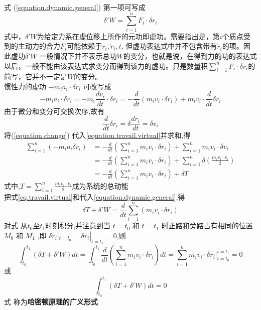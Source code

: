 \documentclass{article}
\begin{document}
式 (\ref{equation.dynamic.general})
第一项可写成
\begin{equation}
 \delta 'W=\sum_{i=1}^n F_i \cdot \delta r_i
 \label{eq.travail.virtual}
\end{equation}
式中，$\delta'W$为给定力系在虚位移上所作的元功即虚功。需要指出是，第$i$个质点受到的主动力的合力$F_i$可能依赖于$r_i,\dot{r}_i,t$,
但虚功表达式中并不包含带有$\dot{r}_i$的项。因此虚功$\delta 'W$ 一般情况下并不表示总功$W$的变分，也就是说，在得到力的功的表达式以后，一般不能由该表达式求变分而得到该力的虚功。只是数量积$\sum_{i=1}^n F_i \cdot \delta r_i$的简写，它并不一定是$W$的变分。
\\
惯性力的虚功
$
-m_ia_i\cdot \delta r_i
$
可改写成
\begin{equation}
-m_ia_i\cdot \delta r_i=-m_i \frac{dv_i}{dt} \cdot \delta r_i = - \frac{d}{dt}(m_i v_i \cdot \delta r_i) + m_i v_i \cdot \frac{d}{dt}\delta r_i
\label{equation.travail.virtual}
\end{equation}
由于微分和变分可交换次序,故有
\begin{equation}
 \frac{d}{dt}\delta r_i =\delta \frac{dr_i}{dt} =\delta v_i
 \label{equation.change}
\end{equation}
将(\ref{equation.change}) 代入\eqref{equation.travail.virtual}并求和,得
\begin{equation}
 \begin{split}
  \sum_{i=1}^n (-m_ia_i \delta r_i)& = -\frac{d}{dt}(\sum_{i=1}^n m_i v_i \cdot \delta r_i) + \sum_{i=1}^n m_i v_i\cdot \delta v_i\\
  & = -\frac{d}{dt}(\sum_{i=1}^n m_i v_i \cdot \delta r_i) + \sum_{i=1}^n \delta (\frac{m_i v_i \cdot v_i}{2}) \\
  & = -\frac{d}{dt}(\sum_{i=1}^n m_i v_i \cdot \delta r_i) + \delta T
 \end{split}
\end{equation}
式中,$T=\sum_{i=1}^n \frac{m_i v_i \cdot v_i}{2}$成为系统的总动能
\\
把式\eqref{eq.travail.virtual}和\lasteq 代入\eqref{equation.dynamic.general},得
\begin{equation}
 \delta T + \delta 'W =\frac{d}{dt}\sum_{i=1}^n (m_i v_i \cdot \delta r_i)
\end{equation}
对式 \lasteq 从$t_0$至$t_1$时刻积分,并注意到当
$t=t_0$ 和 $t=t_1$
时正路和旁路占有相同的位置 $M_0$ 和 $M_1$ ,即
$ \delta r_i|_{t=t_0}= \delta r_i|_{t=t_1}= 0 $,则
\begin{equation}
 \int_{t_0}^{t_1}(\delta T + \delta ' W)dt=\int_{t_0}^{t_1}\frac{d}{dt}(\sum_{i=1}^n m_i v_i \cdot \delta r_i)dt=\sum_{i=1}^n m_i v_i \cdot \delta r_i|_{t=t_0}^{t=t_1}=0
\end{equation}
或
\begin{equation}
 \int_{t_0}^{t_1}(\delta T + \delta ' W)dt=0
\end{equation}
式 \lasteq 称为\textbf{哈密顿原理的广义形式}
\end{document}
